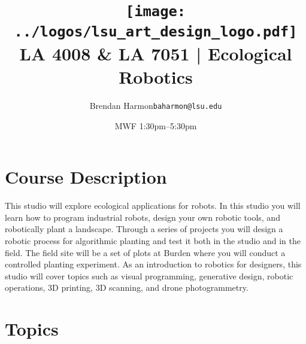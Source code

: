 \documentclass[11pt,article,oneside]{memoir}
\makeatletter
\def\myauthor{Author}
\def\mytitle{Title}
\def\myemail{baharmon@lsu.edu}
\def\myauthor{\normalsize Brendan Harmon}
\def\mytitle{
\texttt{[image: ../logos/lsu\_art\_design\_logo.pdf]}
\vspace*{0.5cm}
\\[0.1cm] {\normalfont \normalsize LA 4008 \& LA 7051 |} \Large Ecological Robotics
}
\newcommand{\globalcolor}[1]{%
  \color{#1}\global\let\default@color\current@color
}
\makeatother
\begin{document}
\setlength\bibitemsep{0.5em}

\setmainfont{Lato Regular}
\setmonofont[Scale=0.8]{IBM Plex Mono}

\def\ind{\hangindent=1 true cm\hangafter=1 \noindent}
\def\labelitemi{$\cdot$}

\title{\LARGE \mytitle}
\author{\Large\myauthor \newline \footnotesize\texttt{\noindent\myemail}}
\date{
\footnotesize
MWF 1:30pm--5:30pm
}
\published{\,}


\globalcolor{black}

\vspace*{-12em}

\maketitle

\vspace*{-2em}
\section{Course Description}
\footnotesize
This studio will explore ecological applications for robots. In this studio you will learn how to program industrial robots, design your own robotic tools, and robotically plant a landscape. Through a series of projects you will design a robotic process for algorithmic planting and test it both in the studio and in the field. The field site will be a set of plots at Burden where you will conduct a controlled planting experiment. As an introduction to robotics for designers, this studio will cover topics such as visual programming, generative design, robotic operations, 3D printing, 3D scanning, and drone photogrammetry. 


\section{Topics}

\end{document}

